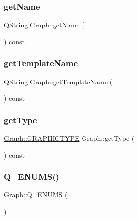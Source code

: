 \hypertarget{class_graph_afbd2fdb1dba6403125c7932d7b18fa8b}{}\label{class_graph_afbd2fdb1dba6403125c7932d7b18fa8b} 
\subsubsection{\texorpdfstring{get\+Name}{getName}}
{\footnotesize\ttfamily Q\+String Graph\+::get\+Name (\begin{DoxyParamCaption}{ }\end{DoxyParamCaption}) const\hspace{0.3cm}{\ttfamily [slot]}}

\hypertarget{class_graph_aa58147fd7b3e9c2455147dfc2d25160e}{}\label{class_graph_aa58147fd7b3e9c2455147dfc2d25160e} 
\subsubsection{\texorpdfstring{get\+Template\+Name}{getTemplateName}}
{\footnotesize\ttfamily Q\+String Graph\+::get\+Template\+Name (\begin{DoxyParamCaption}{ }\end{DoxyParamCaption}) const\hspace{0.3cm}{\ttfamily [slot]}}

\hypertarget{class_graph_a4b6573ea1f4bb9e1803378f1f7a812de}{}\label{class_graph_a4b6573ea1f4bb9e1803378f1f7a812de} 
\subsubsection{\texorpdfstring{get\+Type}{getType}}
{\footnotesize\ttfamily \hyperlink{class_graph_ab17f5821c439d7728a144639aa849501}{Graph\+::\+G\+R\+A\+P\+H\+I\+C\+T\+Y\+PE} Graph\+::get\+Type (\begin{DoxyParamCaption}{ }\end{DoxyParamCaption}) const\hspace{0.3cm}{\ttfamily [slot]}}

\hypertarget{class_graph_a80363b329e9b6c1e2cfb34f8cc4df26e}{}\label{class_graph_a80363b329e9b6c1e2cfb34f8cc4df26e} 
\subsubsection{\texorpdfstring{Q\+\_\+\+E\+N\+U\+M\+S()}{Q\_ENUMS()}}
{\footnotesize\ttfamily Graph\+::\+Q\+\_\+\+E\+N\+U\+MS (\begin{DoxyParamCaption}\item[{\hyperlink{class_graph_ab17f5821c439d7728a144639aa849501}{G\+R\+A\+P\+H\+I\+C\+T\+Y\+PE}}]{ }\end{DoxyParamCaption})\hspace{0.3cm}{\ttfamily [pure virtual]}}



